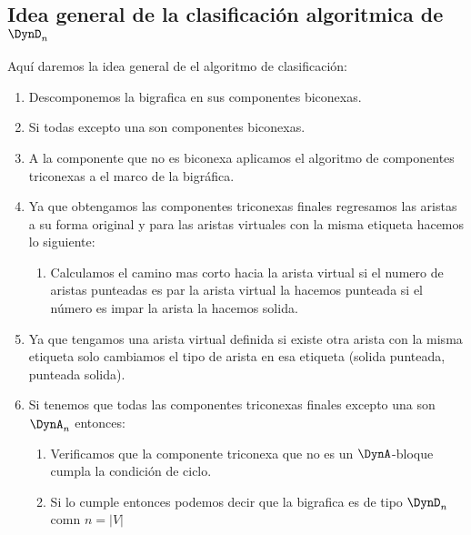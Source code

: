 \begin{example}
        \centering
\end{example}

\subsection{Idea general de la clasificación algoritmica de $\DynD_{n}$}
Aquí daremos la idea general de el algoritmo de clasificación:
\begin{enumerate}
 \item Descomponemos la bigrafica en sus componentes biconexas.
 \item Si todas excepto una son componentes biconexas.
 \item A la componente que no es biconexa aplicamos el algoritmo de componentes triconexas a el marco de la bigráfica.
 \item Ya que obtengamos las componentes triconexas finales regresamos las aristas a su forma original y para las aristas virtuales con la misma etiqueta hacemos lo siguiente:
 \begin{enumerate}
  \item Calculamos el camino mas corto hacia la arista virtual si el numero de aristas punteadas es par la arista virtual la hacemos punteada si el número es impar la arista la hacemos solida.
 \end{enumerate}
 \item Ya que tengamos una arista virtual definida si existe otra arista con la misma etiqueta solo cambiamos el tipo de arista en esa etiqueta (solida \rightarrow punteada, punteada \rightarrow solida).
 \item Si tenemos que todas las componentes triconexas finales excepto una son $\DynA_{n}$ entonces:
 \begin{enumerate}
  \item Verificamos que la componente triconexa que no es un $\DynA$-bloque cumpla la condición de ciclo.
  \item Si lo cumple entonces podemos decir que la bigrafica es de tipo $\DynD_{n}$ comn $n = \left|V\right|$
 \end{enumerate}
\end{enumerate}

